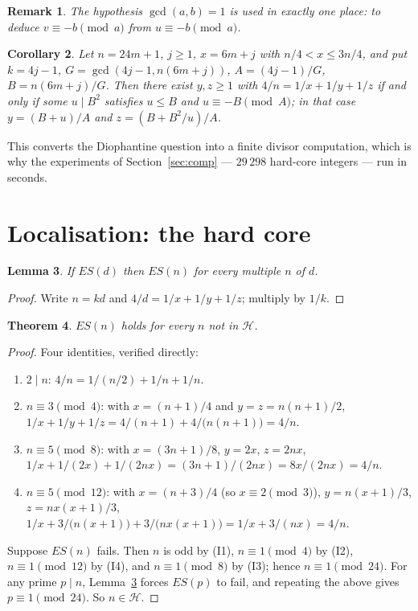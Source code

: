 \documentclass[11pt,a4paper]{article}
\newtheorem{theorem}{Theorem}
\newtheorem{lemma}[theorem]{Lemma}
\newtheorem{corollary}[theorem]{Corollary}
\newtheorem{remark}[theorem]{Remark}
\theoremstyle{definition}
\begin{document}
\begin{remark}
The hypothesis $\gcd(a,b)=1$ is used in exactly one place: to deduce
$v\equiv -b\pmod a$ from $u\equiv -b\pmod a$.
\end{remark}

\begin{corollary}\label{cor:sieve}
Let $n=24m+1$, $j\ge 1$, $x=6m+j$ with $n/4<x\le 3n/4$, and put
$k=4j-1$, $G=\gcd(4j-1,n(6m+j))$, $A=(4j-1)/G$, $B=n(6m+j)/G$. Then there
exist $y,z\ge 1$ with $4/n=1/x+1/y+1/z$ if and only if some $u\mid B^{2}$
satisfies $u\le B$ and $u\equiv -B\pmod A$; in that case
$y=(B+u)/A$ and $z=(B+B^{2}/u)/A$.
\end{corollary}

This converts the Diophantine question into a finite divisor computation, which
is why the experiments of Section~\ref{sec:comp} --- $29\,298$ hard-core
integers --- run in seconds.

\section{Localisation: the hard core}\label{sec:hardcore}

\begin{lemma}\label{lem:descent}
If $ES(d)$ then $ES(n)$ for every multiple $n$ of $d$.
\end{lemma}
\begin{proof}
Write $n=kd$ and $4/d=1/x+1/y+1/z$; multiply by $1/k$.
\end{proof}

\begin{theorem}\label{thm:reduction}
$ES(n)$ holds for every $n$ not in $\mathcal H$.
\end{theorem}
\begin{proof}
Four identities, verified directly:
\begin{enumerate}
\item[(I1)] $2\mid n$: $4/n=1/(n/2)+1/n+1/n$.
\item[(I2)] $n\equiv 3\pmod 4$: with $x=(n+1)/4$ and $y=z=n(n+1)/2$,
      $1/x+1/y+1/z=4/(n+1)+4/\bigl(n(n+1)\bigr)=4/n$.
\item[(I3)] $n\equiv 5\pmod 8$: with $x=(3n+1)/8$, $y=2x$, $z=2nx$,
      $1/x+1/(2x)+1/(2nx)=(3n+1)/(2nx)=8x/(2nx)=4/n$.
\item[(I4)] $n\equiv 5\pmod{12}$: with $x=(n+3)/4$ (so $x\equiv 2\pmod 3$),
      $y=n(x+1)/3$, $z=nx(x+1)/3$,
      $1/x+3/\bigl(n(x+1)\bigr)+3/\bigl(nx(x+1)\bigr)=1/x+3/(nx)=4/n$.
\end{enumerate}
Suppose $ES(n)$ fails. Then $n$ is odd by (I1), $n\equiv 1\pmod 4$ by (I2),
$n\equiv 1\pmod{12}$ by (I4), and $n\equiv 1\pmod 8$ by (I3); hence
$n\equiv 1\pmod{24}$. For any prime $p\mid n$, Lemma~\ref{lem:descent} forces
$ES(p)$ to fail, and repeating the above gives $p\equiv 1\pmod{24}$. So
$n\in\mathcal H$.
\end{proof}
\end{document}
